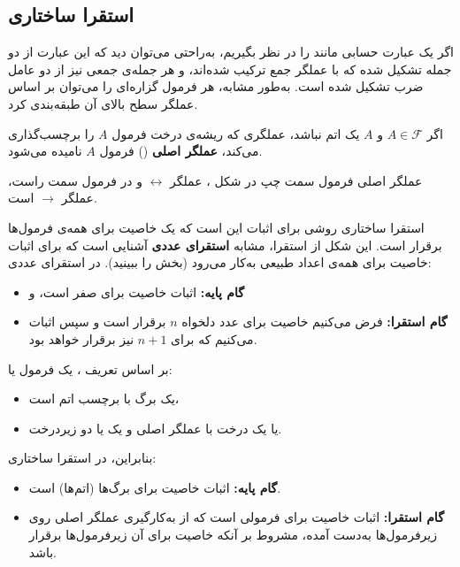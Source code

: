 \subsection*{ \quad استقرا ساختاری}
 
  اگر یک عبارت حسابی مانند  را در نظر بگیریم، به‌راحتی می‌توان دید که این عبارت از دو جمله تشکیل شده که با عملگر جمع ترکیب شده‌اند، و هر جمله‌ی جمعی نیز از دو عامل ضرب تشکیل شده است. به‌طور مشابه، هر فرمول گزاره‌ای را می‌توان بر اساس عملگر سطح بالای آن طبقه‌بندی کرد.
 
  \begin{definition}[تعریف \lr{2.10}]
    اگر $A \in \mathscr{F}$ و $A$ یک اتم نباشد، عملگری که ریشه‌ی درخت فرمول $A$ را برچسب‌گذاری می‌کند، \textbf{عملگر اصلی} () فرمول $A$ نامیده می‌شود.
  \end{definition}
  \begin{example}[مثال \lr{2.11}]
    عملگر اصلی فرمول سمت چپ در شکل ، عملگر $\leftrightarrow$ و در فرمول سمت راست، عملگر $\rightarrow$ است.\\
  \end{example}

  استقرا ساختاری روشی برای اثبات این است که یک خاصیت برای همه‌ی فرمول‌ها برقرار است. این شکل از استقرا، مشابه \textbf{استقرای عددی} آشنایی است که برای اثبات خاصیت برای همه‌ی اعداد طبیعی به‌کار می‌رود (بخش  را ببینید). در استقرای عددی:

  \begin{itemize}
    \item \textbf{گام پایه:} اثبات خاصیت برای صفر است، و
    \item \textbf{گام استقرا:} فرض می‌کنیم خاصیت برای عدد دلخواه $n$ برقرار است و سپس اثبات می‌کنیم که برای $n+1$ نیز برقرار خواهد بود.
  \end{itemize}

  بر اساس تعریف ، یک فرمول یا:
  \begin{itemize}
    \item یک برگ با برچسب اتم است،
    \item یا یک درخت با عملگر اصلی و یک یا دو زیر‌درخت.
  \end{itemize}

  بنابراین، در استقرا ساختاری:
  \begin{itemize}
    \item \textbf{گام پایه:} اثبات خاصیت برای برگ‌ها (اتم‌ها) است.
    \item \textbf{گام استقرا:} اثبات خاصیت برای فرمولی است که از به‌کارگیری عملگر اصلی روی زیر‌فرمول‌ها به‌دست آمده، مشروط بر آنکه خاصیت برای آن زیر‌فرمول‌ها برقرار باشد.
  \end{itemize}

